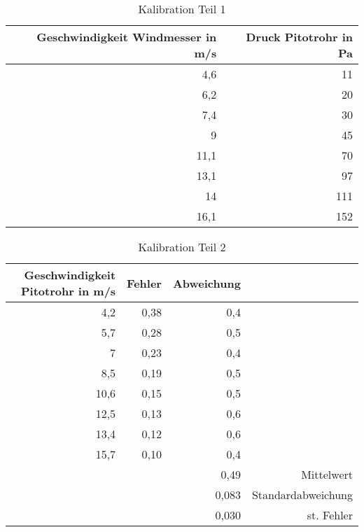 \begin{table}[htbp]
  \centering
  \caption{Kalibration Teil 1}
    \begin{tabular}{rr}
    \toprule
    Geschwindigkeit Windmesser in m/s & Druck Pitotrohr in Pa \\
    \midrule
    4,6   & 11 \\
    6,2   & 20 \\
    7,4   & 30 \\
    9     & 45 \\
    11,1  & 70 \\
    13,1  & 97 \\
    14    & 111 \\
    16,1  & 152 \\
    \bottomrule
    \end{tabular}%
  \label{tab:Kalibration1}%
\end{table}%
\begin{table}[htbp]
  \centering
  \caption{Kalibration Teil 2}
    \begin{tabular}{rrrr}
    \toprule
    Geschwindigkeit Pitotrohr in m/s & Fehler & Abweichung &  \\
    \midrule
    4,2   & 0,38 & 0,4   &  \\
    5,7   & 0,28 & 0,5   &  \\
    7     & 0,23 & 0,4   &  \\
    8,5   & 0,19 & 0,5   &  \\
    10,6  & 0,15 & 0,5   &  \\
    12,5  & 0,13 & 0,6   &  \\
    13,4  & 0,12 & 0,6   &  \\
    15,7  & 0,10 & 0,4   &  \\
          &       & 0,49 & Mittelwert \\
          &       & 0,083 & Standardabweichung \\
          &       & 0,030 & st. Fehler \\
    \bottomrule
    \end{tabular}%
  \label{tab:Kalibration2}%
\end{table}%

